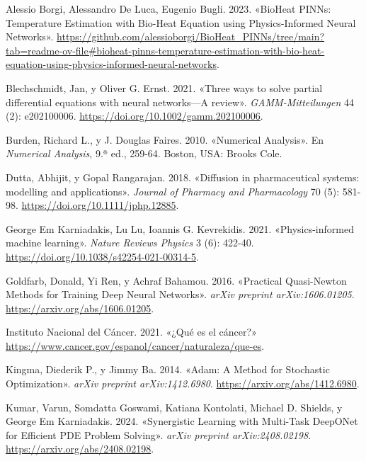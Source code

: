 \documentclass[
  spanish,
  us-letterpaper,
]{scrreprt}
\newlength{\cslhangindent}
\newenvironment{CSLReferences}[2] %
 {\begin{list}{}{%
  \setlength{\itemindent}{0pt}
  \setlength{\leftmargin}{0pt}
  \setlength{\parsep}{0pt}
  \ifodd #1
   \setlength{\leftmargin}{\cslhangindent}
   \setlength{\itemindent}{-1\cslhangindent}
  \fi
  \setlength{\itemsep}{#2\baselineskip}}}
 {\end{list}}
\theoremstyle{plain}
\theoremstyle{definition}
\theoremstyle{remark}
\begin{document}

\label{refs}
\begin{CSLReferences}{1}{0}
Alessio Borgi, Alessandro De Luca, Eugenio Bugli. 2023. {«{BioHeat
PINNs: Temperature Estimation with Bio-Heat Equation using
Physics-Informed Neural Networks}»}.
\url{https://github.com/alessioborgi/BioHeat_PINNs/tree/main?tab=readme-ov-file\#bioheat-pinns-temperature-estimation-with-bio-heat-equation-using-physics-informed-neural-networks}.

Blechschmidt, Jan, y Oliver G. Ernst. 2021. {«Three ways to solve
partial differential equations with neural networks---A review»}.
\emph{GAMM-Mitteilungen} 44 (2): e202100006.
\url{https://doi.org/10.1002/gamm.202100006}.

Burden, Richard L., y J. Douglas Faires. 2010. {«Numerical Analysis»}.
En \emph{Numerical Analysis}, 9.ª ed., 259-64. Boston, USA: Brooks Cole.

Dutta, Abhijit, y Gopal Rangarajan. 2018. {«Diffusion in pharmaceutical
systems: modelling and applications»}. \emph{Journal of Pharmacy and
Pharmacology} 70 (5): 581-98. \url{https://doi.org/10.1111/jphp.12885}.

George Em Karniadakis, Lu Lu, Ioannis G. Kevrekidis. 2021.
{«Physics-informed machine learning»}. \emph{Nature Reviews Physics} 3
(6): 422-40. \url{https://doi.org/10.1038/s42254-021-00314-5}.

Goldfarb, Donald, Yi Ren, y Achraf Bahamou. 2016. {«Practical
Quasi-Newton Methods for Training Deep Neural Networks»}. \emph{arXiv
preprint arXiv:1606.01205}. \url{https://arxiv.org/abs/1606.01205}.

Instituto Nacional del Cáncer. 2021. {«{¿Qué es el cáncer?}»}
\url{https://www.cancer.gov/espanol/cancer/naturaleza/que-es}.

Kingma, Diederik P., y Jimmy Ba. 2014. {«Adam: A Method for Stochastic
Optimization»}. \emph{arXiv preprint arXiv:1412.6980}.
\url{https://arxiv.org/abs/1412.6980}.

Kumar, Varun, Somdatta Goswami, Katiana Kontolati, Michael D. Shields, y
George Em Karniadakis. 2024. {«Synergistic Learning with Multi-Task
DeepONet for Efficient PDE Problem Solving»}. \emph{arXiv preprint
arXiv:2408.02198}. \url{https://arxiv.org/abs/2408.02198}.


\end{CSLReferences}
\end{document}
